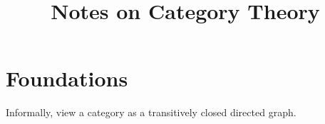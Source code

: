\documentclass[11pt]{article}
\title{Notes on Category Theory}
\begin{document}
\maketitle
\tableofcontents
\section{Foundations}
Informally, view a category as a transitively closed directed graph.
\end{document}
